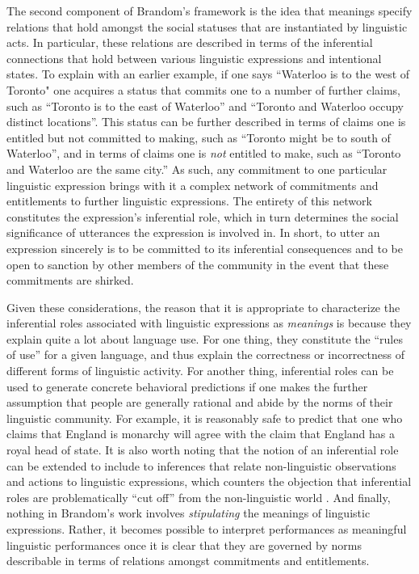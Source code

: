 The second component of Brandom's framework is the idea that meanings specify relations that hold amongst the social statuses that are instantiated by linguistic acts. In particular, these relations are described in terms of the inferential connections that hold between various linguistic expressions and intentional states. To explain with an earlier example, if one says ``Waterloo is to the west of Toronto" one acquires a status that commits one to a number of further claims, such as ``Toronto is to the east of Waterloo'' and ``Toronto and Waterloo occupy distinct locations''. This status can be further described in terms of claims one is entitled but not committed to making, such as ``Toronto might be to south of Waterloo'', and in terms of claims one is \textit{not} entitled to make, such as ``Toronto and Waterloo are the same city.'' As such, any commitment to one particular linguistic expression brings with it a complex network of commitments and entitlements to further linguistic expressions. The entirety of this network constitutes the expression's inferential role, which in turn determines the social significance of utterances the expression is involved in. In short, to utter an expression sincerely is to be committed to its inferential consequences and to be open to sanction by other members of the community in the event that these commitments are shirked. 

Given these considerations, the reason that it is appropriate to characterize the inferential roles associated with linguistic expressions as \textit{meanings} is because they explain quite a lot about language use. For one thing, they constitute the ``rules of use'' for a given language, and thus explain the correctness or incorrectness of different forms of linguistic activity. For another thing, inferential roles can be used to generate concrete behavioral predictions if one makes the further assumption that people are generally rational and abide by the norms of their linguistic community. For example, it is reasonably safe to predict that one who claims that England is monarchy will agree with the claim that England has a royal head of state. It is also worth noting that the notion of an inferential role can be extended to include to inferences that relate non-linguistic observations and actions to linguistic expressions, which counters the objection that inferential roles are problematically ``cut off'' from the non-linguistic world \citep[see][pp. 199-271]{Brandom:1994}. And finally, nothing in Brandom's work involves \textit{stipulating} the meanings of linguistic expressions. Rather, it becomes possible to interpret performances as meaningful linguistic performances once it is clear that they are governed by norms describable in terms of relations amongst commitments and entitlements.

